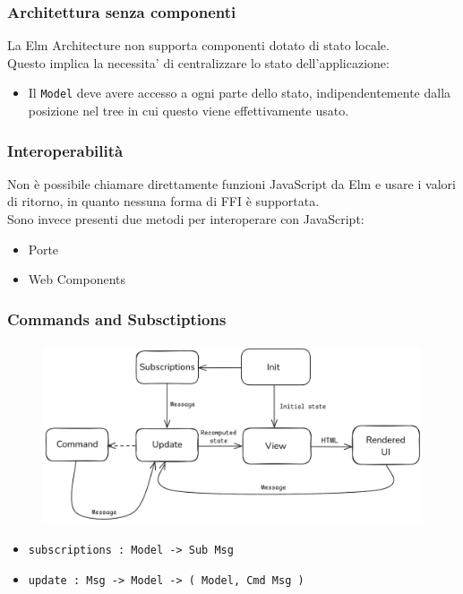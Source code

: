 \documentclass{beamer}
\begin{document}
\begin{frame}
  \frametitle{Architettura senza componenti}
  La Elm Architecture non supporta componenti dotato di stato locale.\\

  Questo implica la necessita' di centralizzare lo stato dell'applicazione:
  \vspace{3pt}
  \begin{itemize}
    \item Il \texttt{Model} deve avere accesso a ogni parte dello stato, indipendentemente dalla posizione nel tree in cui questo viene effettivamente usato.
  \end{itemize}
\end{frame}

\begin{frame}
  \frametitle{Interoperabilità}
  Non è possibile chiamare direttamente funzioni JavaScript da Elm e usare i valori di ritorno, in quanto nessuna forma di FFI è supportata.\\

  Sono invece presenti due metodi per interoperare con JavaScript:
  \vspace{3pt}
  \begin{itemize}
    \item Porte
    \item Web Components
  \end{itemize}

\end{frame}

\begin{frame}[containsverbatim]
  \frametitle{Commands and Subsctiptions}
  \begin{figure}
    \centering
    \includegraphics[height=150pt]{assets/elm-architecture-xt.png}
  \end{figure}
  \begin{itemize}
      \item\begin{verbatim}
subscriptions : Model -> Sub Msg
      \end{verbatim}
      \item\begin{verbatim}
update : Msg -> Model -> ( Model, Cmd Msg )
      \end{verbatim}
  \end{itemize}

\end{frame}
\end{document}
